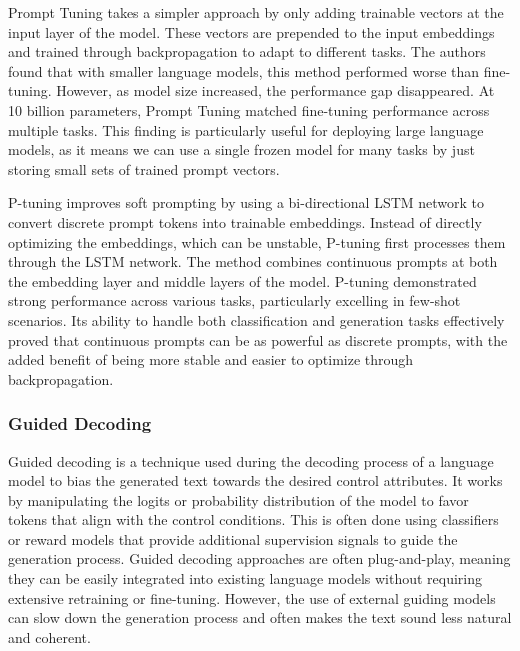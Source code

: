 Prompt Tuning \cite{lester-etal-2021-power} takes a simpler approach by only adding trainable vectors at the input layer of the model. 
These vectors are prepended to the input embeddings and trained through backpropagation to adapt to different tasks. 
The authors found that with smaller language models, this method performed worse than fine-tuning. 
However, as model size increased, the performance gap disappeared. 
At 10 billion parameters, Prompt Tuning matched fine-tuning performance across multiple tasks. 
This finding is particularly useful for deploying large language models, as it means we can use a single frozen model for many tasks by just storing small sets of trained prompt vectors.

P-tuning \cite{liu-etal-2022-p} improves soft prompting by using a bi-directional LSTM network to convert discrete prompt tokens into trainable embeddings. 
Instead of directly optimizing the embeddings, which can be unstable, P-tuning first processes them through the LSTM network. 
The method combines continuous prompts at both the embedding layer and middle layers of the model. 
P-tuning demonstrated strong performance across various tasks, particularly excelling in few-shot scenarios.
Its ability to handle both classification and generation tasks effectively proved that continuous prompts can be as powerful as discrete prompts, with the added benefit of being more stable and easier to optimize through backpropagation.


\subsubsection{Guided Decoding}
Guided decoding is a technique used during the decoding process of a language model to bias the generated text towards the desired control attributes. 
It works by manipulating the logits or probability distribution of the model to favor tokens that align with the control conditions.
This is often done using classifiers or reward models that provide additional supervision signals to guide the generation process.
Guided decoding approaches are often plug-and-play, meaning they can be easily integrated into existing language models without requiring extensive retraining or fine-tuning.
However, the use of external guiding models can slow down the generation process and often makes the text sound less natural and coherent.

